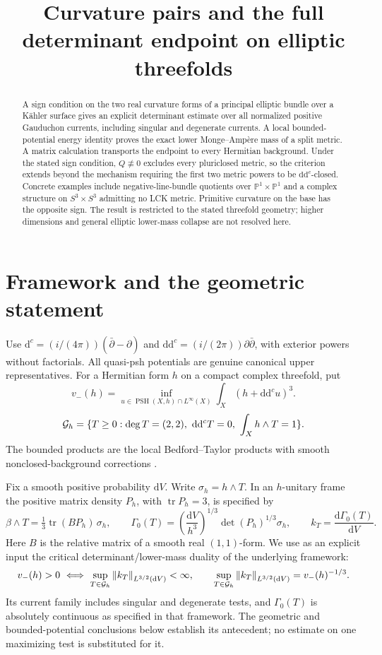 \documentclass[11pt]{article}
\title{Curvature pairs and the full determinant endpoint on elliptic threefolds}
\author{}
\date{}
\newcommand{\ddc}{\mathrm d\mathrm d^c}
\newcommand{\PSH}{\operatorname{PSH}}
\newcommand{\CP}{\mathbb P}
\newcommand{\vol}{\mathrm dV}
\newcommand{\norm}[1]{\left\|#1\right\|}
\begin{document}
\maketitle
\begin{abstract}
A sign condition on the two real curvature forms of a principal elliptic
bundle over a K\"ahler surface gives an explicit determinant estimate over
all normalized positive Gauduchon currents, including singular and degenerate
currents. A local bounded-potential energy identity proves the exact lower
Monge--Amp\`ere mass of a split metric. A matrix calculation transports the
endpoint to every Hermitian background. Under the stated sign condition,
\(Q\not\equiv0\) excludes every pluriclosed metric, so the criterion extends beyond the mechanism requiring
the first two metric powers to be \(\ddc\)-closed. Concrete examples include
negative-line-bundle quotients over \(\CP^1\times\CP^1\) and a complex structure
on \(S^3\times S^3\) admitting no LCK metric. Primitive curvature on the base
has the opposite sign. The result is restricted to the stated threefold
geometry; higher dimensions and general elliptic lower-mass collapse are
not resolved here.
\end{abstract}

\section{Framework and the geometric statement}

Use \(\mathrm d^c=(i/(4\pi))(\bar\partial-\partial)\) and
\(\ddc=(i/(2\pi))\partial\bar\partial\), with exterior powers without
factorials. All quasi-psh potentials are genuine canonical upper
representatives. For a Hermitian form \(h\) on a compact complex threefold,
put
\[
 v_-(h)=\inf_{u\in\PSH(X,h)\cap L^\infty(X)}
                     \int_X(h+\ddc u)^3.
\]
\[
 {\cal G}_h=\{T\ge0:\deg T=(2,2),\
             \ddc T=0,\ \int_Xh\wedge T=1\}.
\]
The bounded products are the local Bedford--Taylor products with smooth
nonclosed-background corrections \cite[Section 2.1]{BGL}.

Fix a smooth positive probability \(\vol\). Write \(\sigma_h=h\wedge T\).
In an \(h\)-unitary frame the positive matrix density \(P_h\), with
\(\operatorname{tr}P_h=3\), is specified by
\[
 \beta\wedge T=\tfrac13\operatorname{tr}(BP_h)\,\sigma_h,
 \qquad
 \Gamma_0(T)=\left(\frac{\vol}{h^3}\right)^{1/3}
                   \det(P_h)^{1/3}\sigma_h,
 \qquad k_T=\frac{\mathrm d\Gamma_0(T)}{\vol}.
\]
Here \(B\) is the relative matrix of a smooth real \((1,1)\)-form.
We use as an explicit input the critical determinant/lower-mass duality
of the underlying framework:
\begin{equation}\label{eq:duality}
 v_-(h)>0\ \Longleftrightarrow\
 \sup_{T\in{\cal G}_h}\norm{k_T}_{L^{3/2}(\vol)}<\infty,
 \qquad
 \sup_{T\in{\cal G}_h}\norm{k_T}_{L^{3/2}(\vol)}
                       =v_-(h)^{-1/3}.
\end{equation}
Its current family includes singular and degenerate tests, and
\(\Gamma_0(T)\) is absolutely continuous as specified in that framework.
The geometric and bounded-potential conclusions below establish its
antecedent; no estimate on one maximizing test is substituted for it.
\end{document}
